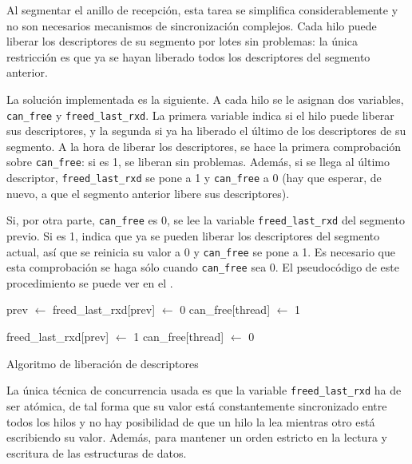 \documentclass[twoside, 12pt]{epstfg}
\begin{document}
Al segmentar el anillo de recepción, esta tarea se simplifica considerablemente y no son necesarios mecanismos de sincronización complejos. Cada hilo puede liberar los descriptores de su segmento por lotes sin problemas: la única restricción es que ya se hayan liberado todos los descriptores del segmento anterior.

La solución implementada es la siguiente. A cada hilo se le asignan dos variables, \texttt{can\_free} y \texttt{freed\_last\_rxd}. La primera variable indica si el hilo puede liberar sus descriptores, y la segunda si ya ha liberado el último de los descriptores de su segmento. A la hora de liberar los descriptores, se hace la primera comprobación sobre \texttt{can\_free}: si es 1, se liberan sin problemas. Además, si se llega al último descriptor, \texttt{freed\_last\_rxd} se pone a 1 y \texttt{can\_free} a 0 (hay que esperar, de nuevo, a que el segmento anterior libere sus descriptores).

Si, por otra parte, \texttt{can\_free} es 0, se lee la variable \texttt{freed\_last\_rxd} del segmento previo. Si es 1, indica que ya se pueden liberar los descriptores del segmento actual, así que se reinicia su valor a 0 y \texttt{can\_free} se pone a 1. Es necesario que esta comprobación se haga sólo cuando \texttt{can\_free} sea 0. El pseudocódigo de este procedimiento se puede ver en el .

\begin{algorithm}[btp]
\begin{algorithmic}
\State prev $\gets$ 
		\State freed\_last\_rxd[prev] $\gets$ 0
		\State can\_free[thread] $\gets$ 1
		\State {}
	\EndIf

		\State {}

			\State {}
			\State freed\_last\_rxd[prev] $\gets$ 1
			\State can\_free[thread] $\gets$ 0
		\EndIf
	\EndIf
\EndFunction
\end{algorithmic}
\caption{Algoritmo de liberación de descriptores}
\label{lst:AlgoritmoDescriptores}
\end{algorithm}

La única técnica de concurrencia usada es que la variable \texttt{freed\_last\_rxd} ha de ser atómica, de tal forma que su valor está constantemente sincronizado entre todos los hilos y no hay posibilidad de que un hilo la lea mientras otro está escribiendo su valor. Además, para mantener un orden estricto en la lectura y escritura de las estructuras de datos.
\end{document}
